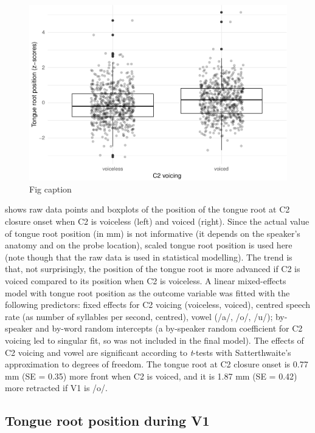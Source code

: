 \documentclass[12pt,]{article}
\begin{document}
\begin{figure}
\includegraphics[width=\linewidth]{2018-tra_files/figure-latex/trp-z-box-1} \caption{Fig caption}\label{f:trp-z-box}
\end{figure}

 shows raw data points and boxplots of the position of
the tongue root at C2 closure onset when C2 is voiceless (left) and
voiced (right). Since the actual value of tongue root position (in mm)
is not informative (it depends on the speaker's anatomy and on the probe
location), scaled tongue root position is used here (note though that
the raw data is used in statistical modelling). The trend is that, not
surprisingly, the position of the tongue root is more advanced if C2 is
voiced compared to its position when C2 is voiceless. A linear
mixed-effects model with tongue root position as the outcome variable
was fitted with the following predictors: fixed effects for C2 voicing
(voiceless, voiced), centred speech rate (as number of syllables per
second, centred), vowel (/a/, /o/, /u/); by-speaker and by-word random
intercepts (a by-speaker random coefficient for C2 voicing led to
singular fit, so was not included in the final model). The effects of C2
voicing and vowel are significant according to \emph{t}-tests with
Satterthwaite's approximation to degrees of freedom. The tongue root at
C2 closure onset is 0.77 mm (SE = 0.35) more front when C2 is voiced,
and it is 1.87 mm (SE = 0.42) more retracted if V1 is /o/.

\subsection{Tongue root position during
V1}\label{tongue-root-position-during-v1}
\end{document}

